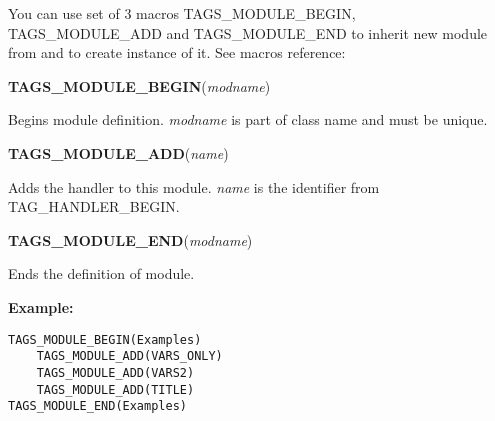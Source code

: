
You can use set of 3 macros TAGS\_MODULE\_BEGIN, TAGS\_MODULE\_ADD and 
TAGS\_MODULE\_END to inherit new module from
 and to create instance of it.
See macros reference:

{\bf TAGS\_MODULE\_BEGIN}({\it modname})

Begins module definition. {\it modname} is part of class name and must
be unique.

{\bf TAGS\_MODULE\_ADD}({\it name})

Adds the handler to this module. {\it name} is the identifier from
TAG\_HANDLER\_BEGIN.

{\bf TAGS\_MODULE\_END}({\it modname})

Ends the definition of module.

{\bf Example:}

\begin{verbatim}
TAGS_MODULE_BEGIN(Examples)
    TAGS_MODULE_ADD(VARS_ONLY)
    TAGS_MODULE_ADD(VARS2)
    TAGS_MODULE_ADD(TITLE)
TAGS_MODULE_END(Examples)
\end{verbatim}

